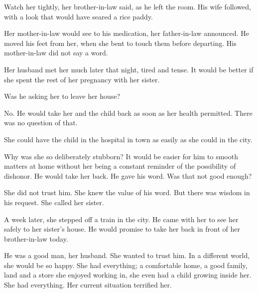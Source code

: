 \documentclass{article}
\begin{document}
Watch her tightly, her brother-in-law said, as he left the room. His wife followed, with a look that would have seared a rice paddy. 

Her mother-in-law would see to his medication, her father-in-law announced. He moved his feet from her, when she bent to touch them before departing. His mother-in-law did not say a word.

Her husband met her much later that night, tired and tense. It would be better if she spent the rest of her pregnancy with her sister. 

Was he asking her to leave her house?

No. He would take her and the child back as soon as her health permitted. There was no question of that. 

She could have the child in the hospital in town as easily as she could in the city. 

Why was she so deliberately stubborn? It would be easier for him to smooth matters at home without her being a constant reminder of the possibility of dishonor. He would take her back. He gave his word. Was that not good enough?

She did not trust him. She knew the value of his word. But there was wisdom in his request. She called her sister.

A week later, she stepped off a train in the city. He came with her to see her safely to her sister's house. He would promise to take her back in front of her brother-in-law today.

He was a good man, her husband. She wanted to trust him. In a different world, she would be so happy. She had everything; a comfortable home, a good family, land and a store she enjoyed working in, she even had a child growing inside her. She had everything. Her current situation terrified her.


 
\end{document}
